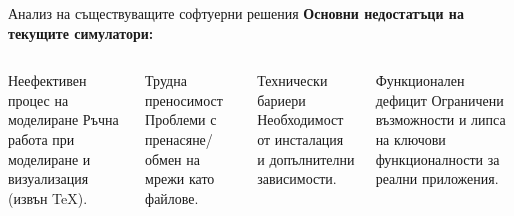 \documentclass[aspectratio=169]{beamer}
\begin{document}
\begin{frame}{Анализ на съществуващите софтуерни решения}
  \textbf{Основни недостатъци на текущите симулатори:}
  \vspace{0.2cm}

  \begin{columns}[T, totalwidth=\textwidth]
      \begin{block}{Неефективен процес на моделиране}
        \small 
        Ръчна работа при моделиране                                     и визуализация (извън \TeX).
      \end{block}

      \begin{block}{Трудна преносимост}
        \small 
        Проблеми с пренасяне/обмен на мрежи като файлове.
      \end{block}

      \begin{block}{Технически бариери}
        \small 
        Необходимост от инсталация и допълнителни зависимости.
      \end{block}

      \begin{block}{Функционален дефицит}
        \small 
        Ограничени възможности и липса на ключови функционалности за реални приложения.
      \end{block}
  \end{columns}
\end{frame}
\end{document}
